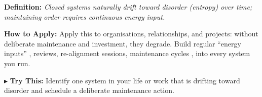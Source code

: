 \begin{tcolorbox}[title={\small \textbf{28 | Thermodynamics}},
  colback=blue!5!white, colframe=blue!40!black,
  fonttitle=\bfseries\small, boxrule=0.5pt]
\textbf{Definition:} \textit{Closed systems naturally drift toward disorder (entropy) over time; maintaining order requires continuous energy input.}

\medskip
\textbf{How to Apply:} Apply this to organisations, relationships, and projects: without deliberate maintenance and investment, they degrade. Build regular ``energy inputs'' , reviews, re-alignment sessions, maintenance cycles , into every system you run.

\medskip
$\blacktriangleright$ \textbf{Try This:} Identify one system in your life or work that is drifting toward disorder and schedule a deliberate maintenance action.
\end{tcolorbox}

